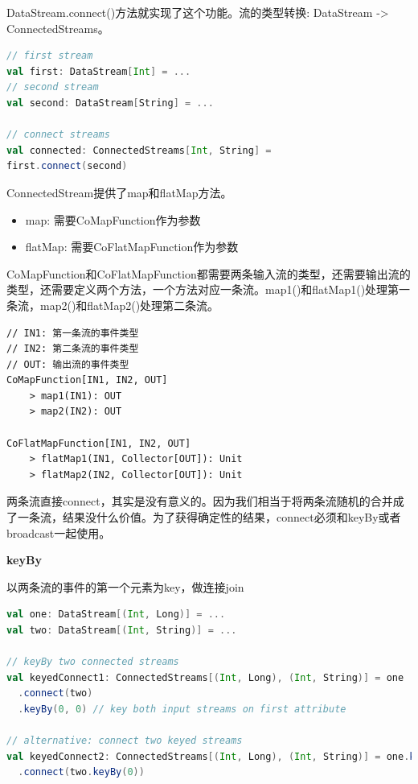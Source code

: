 \documentclass[oneside]{ctexbook}
\begin{document}
DataStream.connect()方法就实现了这个功能。流的类型转换: DataStream -> ConnectedStreams。

\begin{lstlisting}[language=scala, breaklines]
// first stream
val first: DataStream[Int] = ...
// second stream
val second: DataStream[String] = ...

// connect streams
val connected: ConnectedStreams[Int, String] =
first.connect(second)
\end{lstlisting}

ConnectedStream提供了map和flatMap方法。

\begin{itemize}
\item map: 需要CoMapFunction作为参数
\item flatMap: 需要CoFlatMapFunction作为参数
\end{itemize}

CoMapFunction和CoFlatMapFunction都需要两条输入流的类型，还需要输出流的类型，还需要定义两个方法，一个方法对应一条流。map1()和flatMap1()处理第一条流，map2()和flatMap2()处理第二条流。

\begin{lstlisting}
// IN1: 第一条流的事件类型
// IN2: 第二条流的事件类型
// OUT: 输出流的事件类型
CoMapFunction[IN1, IN2, OUT]
    > map1(IN1): OUT
    > map2(IN2): OUT

CoFlatMapFunction[IN1, IN2, OUT]
    > flatMap1(IN1, Collector[OUT]): Unit
    > flatMap2(IN2, Collector[OUT]): Unit
\end{lstlisting}

两条流直接connect，其实是没有意义的。因为我们相当于将两条流随机的合并成了一条流，结果没什么价值。为了获得确定性的结果，connect必须和keyBy或者broadcast一起使用。

\textbf{keyBy}

以两条流的事件的第一个元素为key，做连接join

\begin{lstlisting}[language=scala, breaklines]
val one: DataStream[(Int, Long)] = ...
val two: DataStream[(Int, String)] = ...

// keyBy two connected streams
val keyedConnect1: ConnectedStreams[(Int, Long), (Int, String)] = one
  .connect(two)
  .keyBy(0, 0) // key both input streams on first attribute

// alternative: connect two keyed streams
val keyedConnect2: ConnectedStreams[(Int, Long), (Int, String)] = one.keyBy(0)
  .connect(two.keyBy(0))
\end{lstlisting}
\end{document}
